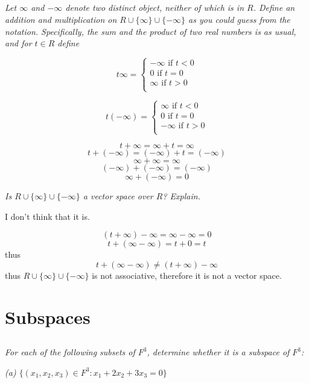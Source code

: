 \documentclass[11pt,oneside,titlepage]{book}
\begin{document}
\subsection{}
\textit{Let $\infty$ and $-\infty$ denote two distinct object, neither of
  which is in $R$. Define an addition and multiplication on
  $R \cup \{\infty\} \cup \{-\infty\}$ as you could guess from the notation.
  Specifically, the sum and the product of two real numbers is as usual,
  and for $t \in R$ define
}

$$
t\infty =
\begin{cases}
  -\infty \text{ if } t < 0 \\
  0 \text{ if } t = 0 \\
  \infty \text{ if } t > 0 \\
\end{cases}
$$

$$
t(-\infty) =
\begin{cases}
  \infty \text{ if } t < 0 \\
  0 \text{ if } t = 0 \\
  -\infty \text{ if } t > 0 \\
\end{cases}
$$

$$t + \infty = \infty + t = \infty$$
$$t + (-\infty) = (-\infty) + t = (-\infty)$$
$$\infty + \infty = \infty$$
$$(-\infty) + (-\infty) = (-\infty)$$
$$\infty + (-\infty) = 0$$

\textit{Is $R \cup \{\infty\} \cup \{-\infty\}$ a vector space over
  $R$? Explain.}

I don't think that it is.

$$(t + \infty) - \infty = \infty - \infty = 0$$
$$t + (\infty - \infty) = t + 0 = t$$
thus
$$t + (\infty - \infty) \neq (t + \infty) - \infty$$
thus 
$R \cup \{\infty\} \cup \{-\infty\}$ is not associative, therefore it is
not a vector space.

\section{Subspaces}

\subsection{}
\textit{For each of the following subsets of $F^3$, determine whether it is a
  subspace of $F^3$:}

\textit{(a) $\{(x_1, x_2, x_3) \in F^3: x_1 + 2x_2 + 3x_3 = 0\}$}
\end{document}
